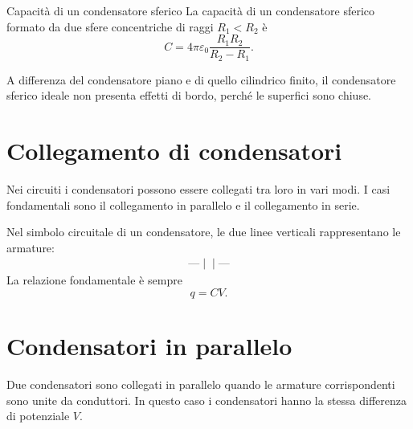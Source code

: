 \documentclass[a4paper]{article}
\begin{document}
\begin{snippettheorem}{Capacità di un condensatore sferico}
    La capacità di un condensatore sferico formato da due sfere concentriche di raggi \(R_1<R_2\) è
    \[
        C=4\pi\varepsilon_0\frac{R_1R_2}{R_2-R_1}.
    \]
\end{snippettheorem}

A differenza del condensatore piano e di quello cilindrico finito, il condensatore sferico ideale non presenta effetti di bordo, perché le superfici sono chiuse.

\section{Collegamento di condensatori}

Nei circuiti i condensatori possono essere collegati tra loro in vari modi. I casi fondamentali sono il collegamento in parallelo e il collegamento in serie.

Nel simbolo circuitale di un condensatore, le due linee verticali rappresentano le armature:
\[
    \begin{array}{c}
        \text{---}\!\mid\!\mid\!\text{---}
    \end{array}
\]
La relazione fondamentale è sempre
\[
    q=CV.
\]

\section{Condensatori in parallelo}

Due condensatori sono collegati in parallelo quando le armature corrispondenti sono unite da conduttori. In questo caso i condensatori hanno la stessa differenza di potenziale \(V\).

\begin{center}
\end{center}
\end{document}
